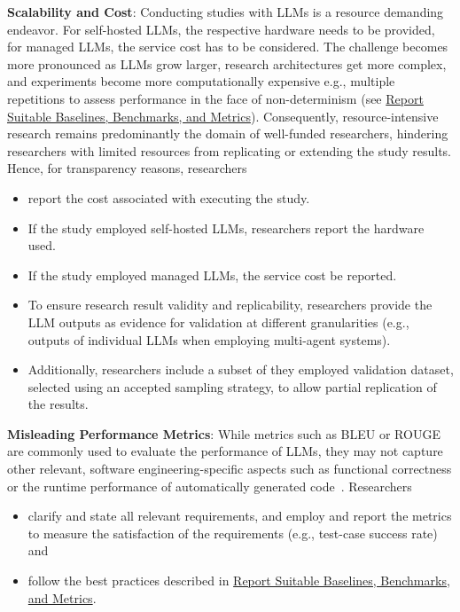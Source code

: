 \textbf{Scalability and Cost}:
Conducting studies with LLMs is a resource demanding endeavor. For self-hosted LLMs, the respective hardware needs to be provided, for managed LLMs, the service cost has to be considered. The challenge becomes more pronounced as LLMs grow larger, research architectures get more complex, and experiments become more computationally expensive e.g., multiple repetitions to assess performance in the face of non-determinism (see \href{/guidelines/report-baselines-benchmarks-and-metrics}{Report Suitable Baselines, Benchmarks, and Metrics}).
Consequently, resource-intensive research remains predominantly the domain of well-funded researchers, hindering researchers with limited resources from replicating or extending the study results. Hence, for transparency reasons, researchers
\begin{itemize}
  \item \should report the cost associated with executing the study. 
  \item If the study employed self-hosted LLMs, researchers \should report the hardware used. 
  \item If the study employed managed LLMs, the service cost \should be reported.
  \item To ensure research result validity and replicability, researchers \must provide the LLM outputs as evidence for validation at different granularities (e.g., outputs of individual LLMs when employing multi-agent systems). %
  \item Additionally, researchers \should include a subset of they employed validation dataset, selected using an accepted sampling strategy, to allow partial replication of the results.
\end{itemize}

\textbf{Misleading Performance Metrics}:
While metrics such as BLEU or ROUGE are commonly used to evaluate the performance of LLMs, they may not capture other relevant, software engineering-specific aspects such as functional correctness or the runtime performance of automatically generated code~\cite{DBLP:conf/nips/LiuXW023}. Researchers
\begin{itemize}
  \item \should clarify and state all relevant requirements, and employ and report the metrics to measure the satisfaction of the requirements (e.g., test-case success rate) and
  \item \should follow the best practices described in \href{/guidelines/report-baselines-benchmarks-and-metrics}{Report Suitable Baselines, Benchmarks, and Metrics}.
\end{itemize}

